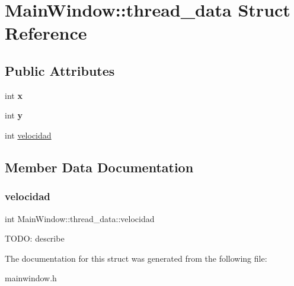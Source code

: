\hypertarget{structMainWindow_1_1thread__data}{}\section{Main\+Window\+:\+:thread\+\_\+data Struct Reference}
\label{structMainWindow_1_1thread__data}
\subsection*{Public Attributes}
\begin{DoxyCompactItemize}
\item 
\mbox{\label{structMainWindow_1_1thread__data_af67cdde878a4acded2527c86ef9d05bb}} 
int {\bfseries x}
\item 
\mbox{\label{structMainWindow_1_1thread__data_aa6958a7bf3474feea19153ffbdd8176d}} 
int {\bfseries y}
\item 
int \hyperlink{structMainWindow_1_1thread__data_ad746a13e6926f5277f86214e9b19b7c8}{velocidad}
\end{DoxyCompactItemize}


\subsection{Member Data Documentation}
\mbox{\label{structMainWindow_1_1thread__data_ad746a13e6926f5277f86214e9b19b7c8}} 
\subsubsection{\texorpdfstring{velocidad}{velocidad}}
{\footnotesize\ttfamily int Main\+Window\+::thread\+\_\+data\+::velocidad}

T\+O\+DO\+: describe 

The documentation for this struct was generated from the following file\+:\begin{DoxyCompactItemize}
\item 
mainwindow.\+h\end{DoxyCompactItemize}
